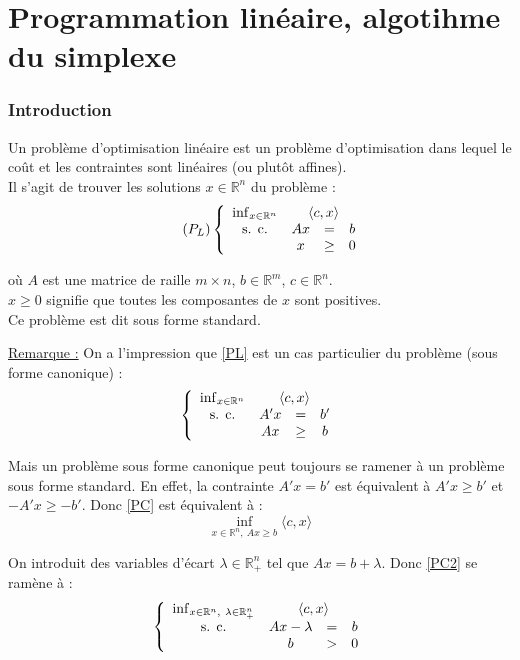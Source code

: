 \part{Programmation lin\'eaire, algotihme du simplexe}
\section{Introduction}
Un problème d'optimisation linéaire est un problème d'optimisation dans lequel le coût et les contraintes sont linéaires (ou plutôt affines).\\
Il s'agit de trouver les solutions $x\in\mathbb{R}^n$ du problème :
\begin{equation}\tag{$P_L$} \label{PL}
	\left\{ \begin{array}{c c c c} \inf_{x\in\mathbb{R}^n} & \multicolumn{3}{c}{\langle c,x\rangle} \\
						\text{s. c.}     & Ax &=& b \\
								& x &\geq& 0
	\end{array} \right.
\end{equation}

où $A$ est une matrice de raille $m\times n$, $b\in\mathbb{R}^m$, $c\in\mathbb{R}^n$.\\
$x\geq 0$ signifie que toutes les composantes de $x$ sont positives.\\
Ce problème est dit sous forme standard.

\bigskip
\underline{Remarque :} On a l'impression que \ref{PL} est un cas particulier du problème (sous forme canonique) : 
\begin{equation} \label{PC}
	\left\{ \begin{array}{c c c c} \inf_{x\in\mathbb{R}^n} & \multicolumn{3}{c}{\langle c,x\rangle} \\
						\text{s. c.}     & A'x &=& b' \\
								& Ax &\geq& b
	\end{array} \right.
\end{equation}

Mais un problème sous forme canonique peut toujours se ramener à un problème sous forme standard. En effet, la contrainte $A'x=b'$ est équivalent à $A'x\geq b'$ et $-A'x\geq -b'$. Donc \ref{PC} est équivalent à :
\begin{equation} \label{PC2} \inf_{x\in\mathbb{R}^n,\ Ax\geq b} \langle c,x\rangle\end{equation}

On introduit des variables d'écart $\lambda\in\mathbb{R}^n_+$ tel que $Ax=b+\lambda$. Donc \ref{PC2} se ramène à :
\[	\left\{ \begin{array}{c c c c} \inf_{x\in\mathbb{R}^n,\ \lambda\in\mathbb{R}^n_+} & \multicolumn{3}{c}{\langle c,x\rangle} \\
						\text{s. c.}     & Ax-\lambda &=& b \\
								& b &>& 0
	\end{array} \right.\]

